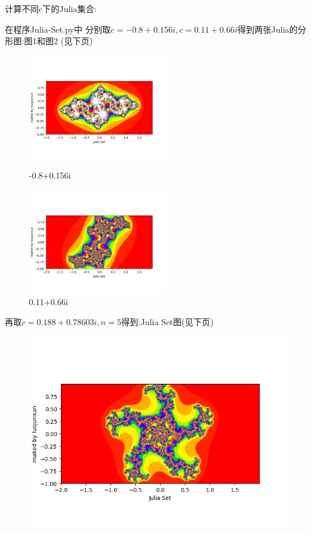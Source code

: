 \documentclass{beamer}
\begin{document}
\begin{frame}{计算不同c下的Julia集合:}
  
  在程序Julia-Set.py中
  分别取$c =-0.8+0.156i,c = 0.11+0.66i$得到两张Julia的分形图:图1和图2 (见下页)
\end{frame}
\begin{frame}{}
  \begin{figure}[htbp]
    \centering
    \begin{minipage}[t]{0.48\textwidth}
    \centering
    \includegraphics[width=6cm]{julia with c = (-0.8+0.156j).png}
    \caption{-0.8+0.156i}
    \end{minipage}
    \begin{minipage}[t]{0.48\textwidth}
    \centering
    \includegraphics[width=6cm]{julia with c = (0.11+0.66j).png}
    \caption{0.11+0.66i}
    \end{minipage}
\end{figure}
\end{frame}
\begin{frame}
再取$c = 0.188+0.78603i , n = 5$得到:Julia Set图(见下页)
\begin{figure}[h]
    \centering
    \includegraphics[scale = 0.6]{julia with c = (0.188+0.78603j).png}

\end{figure}
\end{frame}
\end{document}
